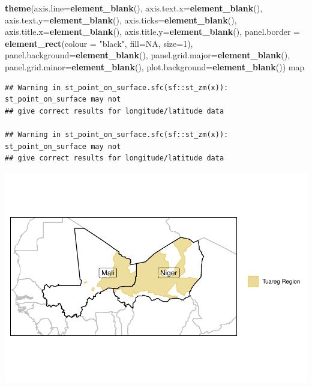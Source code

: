 \documentclass[
]{article}
\newenvironment{Shaded}{\begin{snugshade}}{\end{snugshade}}
\newcommand{\DataTypeTok}[1]{\textcolor[rgb]{0.13,0.29,0.53}{#1}}
\newcommand{\DecValTok}[1]{\textcolor[rgb]{0.00,0.00,0.81}{#1}}
\newcommand{\KeywordTok}[1]{\textcolor[rgb]{0.13,0.29,0.53}{\textbf{#1}}}
\newcommand{\NormalTok}[1]{#1}
\newcommand{\OtherTok}[1]{\textcolor[rgb]{0.56,0.35,0.01}{#1}}
\newcommand{\StringTok}[1]{\textcolor[rgb]{0.31,0.60,0.02}{#1}}
\begin{document}
\begin{Shaded}
\begin{Highlighting}[]
\StringTok{  }\KeywordTok{theme}\NormalTok{(}\DataTypeTok{axis.line=}\KeywordTok{element_blank}\NormalTok{(),}
          \DataTypeTok{axis.text.x=}\KeywordTok{element_blank}\NormalTok{(),}
          \DataTypeTok{axis.text.y=}\KeywordTok{element_blank}\NormalTok{(),}
          \DataTypeTok{axis.ticks=}\KeywordTok{element_blank}\NormalTok{(),}
          \DataTypeTok{axis.title.x=}\KeywordTok{element_blank}\NormalTok{(),}
          \DataTypeTok{axis.title.y=}\KeywordTok{element_blank}\NormalTok{(),   }
          \DataTypeTok{panel.border =} \KeywordTok{element_rect}\NormalTok{(}\DataTypeTok{colour =} \StringTok{"black"}\NormalTok{, }\DataTypeTok{fill=}\OtherTok{NA}\NormalTok{, }\DataTypeTok{size=}\DecValTok{1}\NormalTok{),}
          \DataTypeTok{panel.background=}\KeywordTok{element_blank}\NormalTok{(), }
          \DataTypeTok{panel.grid.major=}\KeywordTok{element_blank}\NormalTok{(),}
          \DataTypeTok{panel.grid.minor=}\KeywordTok{element_blank}\NormalTok{(),}
          \DataTypeTok{plot.background=}\KeywordTok{element_blank}\NormalTok{()) }
\NormalTok{map}
\end{Highlighting}
\end{Shaded}

\begin{verbatim}
## Warning in st_point_on_surface.sfc(sf::st_zm(x)): st_point_on_surface may not
## give correct results for longitude/latitude data

## Warning in st_point_on_surface.sfc(sf::st_zm(x)): st_point_on_surface may not
## give correct results for longitude/latitude data
\end{verbatim}

\includegraphics{06_tjbrailey_map_files/figure-latex/unnamed-chunk-2-1.pdf}
\end{document}
